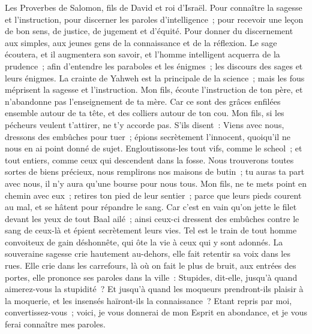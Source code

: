 \begin{multicols}{2}
\VerseOne{}Les Proverbes de Salomon, fils de David et roi d'Israël.
Pour connaître la sagesse et l'instruction, pour discerner les paroles d'intelligence~;
pour recevoir une leçon de bon sens, de justice, de jugement et d'équité.
Pour donner du discernement aux simples, aux jeunes gens de la connaissance et de la réflexion.
Le sage écoutera, et il augmentera son savoir, et l'homme intelligent acquerra de la prudence~;
afin d'entendre les paraboles et les énigmes~; les discours des sages et leurs énigmes.
La crainte de Yahweh est la principale de la science~; mais les fous méprisent la sagesse et l'instruction.
Mon fils, écoute l'instruction de ton père, et n'abandonne pas l'enseignement de ta mère.
Car ce sont des grâces enfilées ensemble autour de ta tête, et des colliers autour de ton cou.
Mon fils, si les pécheurs veulent t'attirer, ne t'y accorde pas.
S'ils disent~: Viens avec nous, dressons des embûches pour tuer~; épions secrètement l'innocent, quoiqu'il ne nous en ai point donné de sujet.
Engloutissons-les tout vifs, comme le scheol~; et tout entiers, comme ceux qui descendent dans la fosse.
Nous trouverons toutes sortes de biens précieux, nous remplirons nos maisons de butin~;
tu auras ta part avec nous, il n'y aura qu'une bourse pour nous tous.
Mon fils, ne te mets point en chemin avec eux~; retires ton pied de leur sentier~;
parce que leurs pieds courent au mal, et se hâtent pour répandre le sang.
Car c'est en vain qu'on jette le filet devant les yeux de tout Baal ailé~;
ainsi ceux-ci dressent des embûches contre le sang de ceux-là et épient secrètement leurs vies.
Tel est le train de tout homme convoiteux de gain déshonnête, qui ôte la vie à ceux qui y sont adonnés.
La souveraine sagesse crie hautement au-dehors, elle fait retentir sa voix dans les rues.
Elle crie dans les carrefours, là où on fait le plus de bruit, aux entrées des portes, elle prononce ses paroles dans la ville~:
Stupides, dit-elle, jusqu'à quand aimerez-vous la stupidité~? Et jusqu'à quand les moqueurs prendront-ils plaisir à la moquerie, et les insensés haïront-ils la connaissance~?
Etant repris par moi, convertissez-vous~; voici, je vous donnerai de mon Esprit en abondance, et je vous ferai connaître mes paroles.

\end{multicols}

